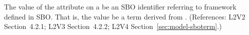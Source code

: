 The value of the  attribute on a \Model {} be an SBO
identifier referring to  framework defined in SBO.  That is, the
value  be a term derived from \sbointeraction.  (References: L2V2
Section~4.2.1; L2V3 Section~4.2.2; L2V4 Section~\ref{sec:model-sboterm}.)
